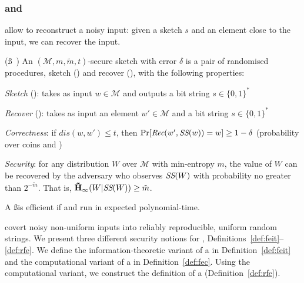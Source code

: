 \subsubsection*{\sss and \fes}
\sss allow to reconstruct a noisy input: given a sketch $s$ and an element close to the input, we can recover the input. 

\begin{definition}{(\ss~\cite{compfe})}\label{def:ss} An $(\mathcal{M}, m, \tilde{m}, t)$-secure sketch with error $\delta$ is a pair of randomised procedures, sketch (\sk) and recover (\rec), with the following properties:

\textit{Sketch} (\sk): takes as input $w \in \mathcal{M}$ and outputs a bit string $s \in \{0, 1\}^*$

\textit{Recover} (\rec): takes as input an element $w' \in \mathcal{M}$ and a bit string $s \in \{0, 1\}^*$

\textit{Correctness}: if $dis(w, w') \leq t$, then $\Pr[\textit{Rec}(w',\textit{SS}(w))=w] \geq 1-\delta$ (probability over coins \sk and \rec)

\textit{Security}: for any distribution $W$ over $\mathcal{M}$ with min-entropy $m$, the value of $W$ can be recovered by the adversary who observes $\textit{SS}(W)$ with probability no greater than $2^{-\tilde{m}}$. That is, $\mathbf{\tilde{H}}_\infty(W|\textit{SS}(W)) \geq \tilde{m}$.
\end{definition}
A \ss is efficient if \sk and \rec run in expected polynomial-time.

\fes covert noisy non-uniform inputs into reliably reproducible, uniform random strings. We present three different security notions for \fes, Definitions~\ref{def:feit}--\ref{def:rfe}.
We define the information-theoretic variant of a \fe in Definition~\ref{def:feit} and the computational variant of a \fe in Definition~\ref{def:fec}. Using the computational variant, we construct the definition of a \rfe (Definition~\ref{def:rfe}).


